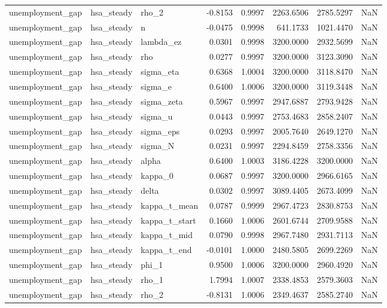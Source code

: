 \begin{tabular}{lllrrrrl}
unemployment\_gap & hsa\_steady & rho\_2 & -0.8153 & 0.9997 & 2263.6506 & 2785.5297 & NaN \\
unemployment\_gap & hsa\_steady & n & -0.0475 & 0.9998 & 641.1733 & 1021.4470 & NaN \\
unemployment\_gap & hsa\_steady & lambda\_ez & 0.0301 & 0.9998 & 3200.0000 & 2932.5699 & NaN \\
unemployment\_gap & hsa\_steady & rho & 0.0277 & 0.9997 & 3200.0000 & 3123.3090 & NaN \\
unemployment\_gap & hsa\_steady & sigma\_eta & 0.6368 & 1.0004 & 3200.0000 & 3118.8470 & NaN \\
unemployment\_gap & hsa\_steady & sigma\_e & 0.6400 & 1.0006 & 3200.0000 & 3119.3448 & NaN \\
unemployment\_gap & hsa\_steady & sigma\_zeta & 0.5967 & 0.9997 & 2947.6887 & 2793.9428 & NaN \\
unemployment\_gap & hsa\_steady & sigma\_u & 0.0443 & 0.9997 & 2753.4683 & 2858.2407 & NaN \\
unemployment\_gap & hsa\_steady & sigma\_eps & 0.0293 & 0.9997 & 2005.7640 & 2649.1270 & NaN \\
unemployment\_gap & hsa\_steady & sigma\_N & 0.0231 & 0.9997 & 2294.8459 & 2758.3356 & NaN \\
unemployment\_gap & hsa\_steady & alpha & 0.6400 & 1.0003 & 3186.4228 & 3200.0000 & NaN \\
unemployment\_gap & hsa\_steady & kappa\_0 & 0.0687 & 0.9997 & 3200.0000 & 2966.6165 & NaN \\
unemployment\_gap & hsa\_steady & delta & 0.0302 & 0.9997 & 3089.4405 & 2673.4099 & NaN \\
unemployment\_gap & hsa\_steady & kappa\_t\_mean & 0.0787 & 0.9999 & 2967.4723 & 2830.8753 & NaN \\
unemployment\_gap & hsa\_steady & kappa\_t\_start & 0.1660 & 1.0006 & 2601.6744 & 2709.9588 & NaN \\
unemployment\_gap & hsa\_steady & kappa\_t\_mid & 0.0790 & 0.9998 & 2967.7480 & 2931.7113 & NaN \\
unemployment\_gap & hsa\_steady & kappa\_t\_end & -0.0101 & 1.0000 & 2480.5805 & 2699.2269 & NaN \\
unemployment\_gap & hsa\_steady & phi\_1 & 0.9500 & 1.0006 & 3200.0000 & 2960.4920 & NaN \\
unemployment\_gap & hsa\_steady & rho\_1 & 1.7994 & 1.0007 & 2338.4853 & 2579.3603 & NaN \\
unemployment\_gap & hsa\_steady & rho\_2 & -0.8131 & 1.0006 & 2349.4637 & 2585.2740 & NaN \\

\end{tabular}
